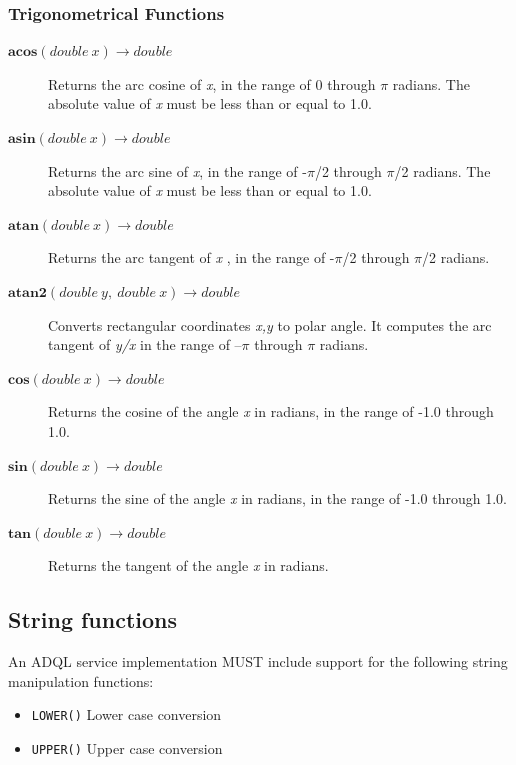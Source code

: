 \documentclass[11pt,a4paper]{ivoa}
\begin{document}
\subsubsection{Trigonometrical Functions}
\begin{description}
    \item[\texttt{$\textbf{acos}(double\ x) \to double$}]
    Returns the arc cosine of \textit{x}, in the range of 0 through
    \(\pi\) radians. The absolute value of \textit{x} must be less than or
    equal to 1.0.
    
    \item[\texttt{$\textbf{asin}(double\ x) \to double$}]
    Returns the arc sine of \textit{x}, in the range of -\(\pi\)/2 through
    \(\pi\)/2 radians. The absolute value of \textit{x} must be less than or
    equal to 1.0.
    
    \item[\texttt{$\textbf{atan}(double\ x) \to double$}]
    Returns the arc tangent of \textit{x} , in the range of -\(\pi\)/2
    through \(\pi\)/2 radians.
    
    \item[\texttt{$\textbf{atan2}(double\ y,\ double\ x) \to double$}]
    Converts rectangular coordinates \textit{x,y} to polar angle. It
    computes the arc tangent of \textit{y/x} in the range of –\(\pi\)
    through \(\pi\) radians.
    
    \item[\texttt{$\textbf{cos}(double\ x) \to double$}]
    Returns the cosine of the angle \textit{x} in radians, in the range of
    -1.0 through 1.0.
    
    \item[\texttt{$\textbf{sin}(double\ x) \to double$}]
    Returns the sine of the angle \textit{x} in radians, in the range of
    -1.0 through 1.0.
    
    \item[\texttt{$\textbf{tan}(double\ x) \to double$}]
    Returns the tangent of the angle \textit{x} in radians.
\end{description}

\subsection{String functions}
\label{sec:string.functions}

An ADQL service implementation MUST include support for the following string
manipulation functions:

\begin{itemize}
    \item \verb:LOWER(): Lower case conversion
    \item \verb:UPPER(): Upper case conversion
\end{itemize}
\end{document}
